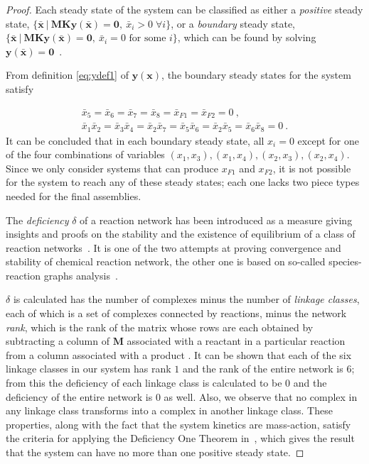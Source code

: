 		\begin{proof}
		
		Each steady state of the system can be classified
		as either a {\it positive} steady state, $\{ \mathbf{\bar{x}}
		~|~\mathbf{M}\mathbf{K}\mathbf{y(\bar{x})} = \mathbf{0}, ~\bar{x}_i > 0 \; \forall i\}$, or a {\it boundary} steady state, $\{ \mathbf{\bar{x}}
		~|~\mathbf{M}\mathbf{K}\mathbf{y(\bar{x})} = \mathbf{0}, ~\bar{x}_i
		= 0 \mbox{ for some } i\}$, which can be found by solving
		$\mathbf{y(\mathbf{\bar{x}})} = \mathbf{0}$~\cite{Chaves:2004p11839}.
		
		From definition \eqref{eq:ydef1} of $\mathbf{y(x)}$, the boundary
		steady states for the system satisfy
		
		\begin{eqnarray}
		\bar{x}_5 = \bar{x}_6 = \bar{x}_7 = \bar{x}_8 = \bar{x}_{F1} =
		\bar{x}_{F2} = 0~, \nonumber \\
		\bar{x}_1 \bar{x}_2 = \bar{x}_3 \bar{x}_4 = \bar{x}_2 \bar{x}_7=
		\bar{x}_5 \bar{x}_6 = \bar{x}_2 \bar{x}_5 = \bar{x}_6 \bar{x}_8 =
		0~.
		\end{eqnarray}
		It can be concluded that in each boundary steady state, all $x_i =
		0$ except for one of the four combinations of variables $(x_1,x_3),
		(x_1,x_4), (x_2,x_3), (x_2,x_4)$.  Since we only consider systems
		that can produce $x_{F1}$ and $x_{F2}$, it is not possible for the
		system to reach any of these steady states; each one lacks two piece
		types needed for the final assemblies.

		The {\it deficiency} $\delta$ of a reaction network has been introduced 
		as a measure giving insights and proofs on the stability and the existence of equilibrium of a class of reaction networks~\cite{Feinberg:1987p9428, Craciun:2005p10148, Craciun:2006p9417, Feinberg:1995p9419, Feinberg:1997p9425, Bernstein:1999p10604, Craciun:2006p10142}. It is one of the two attempts at proving convergence and stability of chemical reaction network, the other one is based on so-called species-reaction graphs analysis~\cite{Sontag:2007p9303, Angeli:2008p9287, Sontag:2004p9319, Chaves:2004p9259, Sontag:2001p9286}.
		
		$\delta$ is calculated has the number of complexes minus the number of {\it linkage classes}, each of which
		is a set of complexes connected by reactions, minus the network {\it
		rank}, which is the rank of the matrix whose rows are each obtained
		by subtracting a column of $\mathbf{M}$ associated with a reactant
		in a particular reaction from a column associated with a product
		\cite{Feinberg:1987p9428}.  It can be shown that each of the six
		linkage classes in our system has rank $1$ and the rank of the
		entire network is $6$; from this the deficiency of each linkage
		class is calculated to be $0$ and the deficiency of the entire
		network is $0$ as well. Also, we observe that no complex in any
		linkage class transforms into a complex in another linkage class.
		These properties, along with the fact that the system kinetics are
		mass-action, satisfy the criteria for applying the Deficiency One
		Theorem in~\cite{Feinberg:1987p9428}, which gives the result that
		the system can have no more than one positive steady state.


\end{proof}
